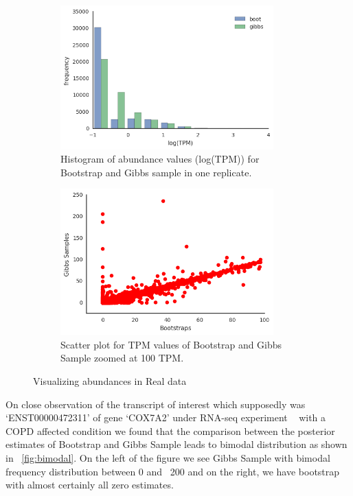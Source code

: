 \documentclass{article}
\begin{document}
\begin{figure}
  \centering
  \begin{subfigure}[t]{0.46\textwidth}
    \centering
      \includegraphics[width=0.9\textwidth]{figures/bootGibbsHist.png}
      \caption{\label{fig:bootGibbsHist} Histogram of abundance values (log(TPM)) for Bootstrap and Gibbs sample in one replicate.}
  \end{subfigure}
  \qquad
  \begin{subfigure}[t]{0.46\textwidth}
    \centering
    \includegraphics[width=0.9\textwidth]{figures/gibbsVBoot.png}
    \caption{ \label{fig:gibbsVBoot} Scatter plot for TPM values of Bootstrap and Gibbs Sample zoomed at 100 TPM. }
  \end{subfigure}
  \caption{Visualizing abundances in Real data}
\end{figure}

On close observation of the transcript of interest which supposedly was `ENST00000472311' of gene `COX7A2' under RNA-seq
experiment ~\citep{kim2015comprehensive} with a COPD affected condition we found that the comparison between the posterior estimates of Bootstrap and
Gibbs Sample leads to bimodal distribution as shown in ~\cref{fig:bimodal}. On the left of the figure we see Gibbs Sample
with bimodal frequency distribution between 0 and ~200 and on the right, we have bootstrap with almost certainly all zero estimates.
\end{document}
